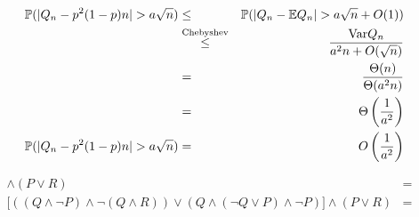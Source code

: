 \documentclass[a4paper]{article}
\begin{document}
\begin{eqnarray*}
  \mathbb{P}(|Q_n - p^2(1-p)n| > a\sqrt{n}) &\le& \mathbb{P}(|Q_n - \mathbb{E} Q_n| > a\sqrt{n} + O(1)) \\
    &\overset{\mathrm{Chebyshev}}{\le}& \frac{\mathrm{Var} Q_n}{a^2 n + O(\sqrt{n})} \\
    &=& \frac{\Theta(n)}{\Theta(a^2n)} \\
    &=& \Theta\left(\frac{1}{a^2}\right) \\
  \mathbb{P}(|Q_n - p^2(1-p)n| > a\sqrt{n}) &=& O\left(\frac{1}{a^2}\right) \\
\end{eqnarray*}
\endproof


\begin{eqnarray*}
 [ \neg ((Q \wedge \neg P) \wedge \neg (Q \wedge R)) \rightarrow (Q
\wedge (Q \rightarrow P) \wedge \neg P)] \wedge (P \vee R) &=& \\
 \lbrack ((Q \wedge \neg P) \wedge \neg (Q \wedge R)) \vee (Q \wedge
(\neg Q \vee P) \wedge \neg P) \rbrack  \wedge (P \vee R) &=& \\
\end{eqnarray*}
\end{document}
